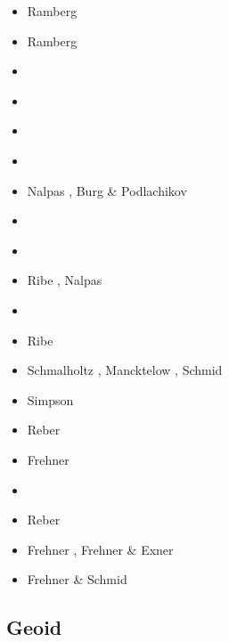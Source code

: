 
\begin{scriptsize}
\begin{itemize}
\item[\nineteenseventy] Ramberg \cite{ramb70}
\item[\nineteenseventyone] Ramberg \cite{ramb71}
\item[\nineteenninetyone] \cite{flet91}
\item[\nineteenninetythree] \cite{zhhj93}
\item[\nineteenninetyfive] \cite{flet95}
\item[\nineteenninetysix] \cite{zhho96}
\item[\nineteenninetynine] Nalpas \etal \cite{nagg99}, Burg \& Podlachikov \cite{bupo99}
\item[\twothousandone] \cite{scpo01}
\item[\twothousandtwo] \cite{mumh02}
\item[\twothousandthree] Ribe \cite{ribe03}, Nalpas \etal \cite{nagv03}
\item[\twothousandsix] \cite{frsc06}
\item[\twothousandseven] Ribe \etal \cite{risr07}
\item[\twothousandeight] Schmalholtz \cite{schm08}, Mancktelow \cite{manc08}, Schmid \etal \cite{scdk08}
\item[\twothousandnine] Simpson \cite{simp09}
\item[\twothousandten] Reber \etal \cite{resb10}
\item[\twothousandeleven] Frehner \cite{freh11}
\item[\twothousandtwelve] \cite{reds12}\cite{grsc12}\cite{scsc12}
\item[\twothousandthirteen] Reber \etal \cite{regc13}
\item[\twothousandfourteen] Frehner \cite{freh14}, Frehner \& Exner \cite{frex14}
\item[\twothousandsixteen] Frehner \& Schmid \cite{frsc16}
\end{itemize}
\end{scriptsize}

\subsection{Geoid}


